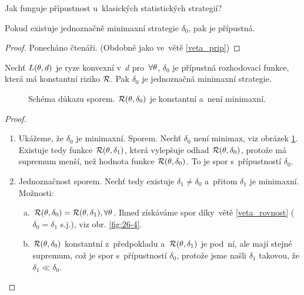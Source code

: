 Jak funguje přípustnost u~klasických statistických strategií?
\begin{theorem}\label{veta_mini}
	Pokud existuje jednoznačně minimaxní strategie $\delta_0$, pak je přípustná.\begin{proof}
		Ponecháno čtenáři. (Obdobně jako ve~větě \ref{veta_prip})
	\end{proof}
\end{theorem}
\begin{theorem}["Obrátka"]
	Nechť $L(\theta,d)$ je ryze konvexní v~$d$ pro~$\forall\theta$, $\delta_0$ je přípustná rozhodovací funkce, která má konstantní riziko $\mathcal{R}$. Pak $\delta_0$ je jednoznačná minimaxní strategie.
	\begin{figure}[h]
		\centering
		\caption{Schéma důkazu sporem. $ \mathcal{R}(\theta,\delta_0)$ je konstantní a~není minimaxní.}
		\label{fig:26-3}
	\end{figure}
	
	\begin{proof}
		\begin{enumerate}[1)]
			\item Ukážeme, že $\delta_0$ je minimaxní. Sporem. Nechť $\delta_0$ není minimax, viz obrázek \ref{fig:26-3}. Existuje tedy funkce $\mathcal{R}(\theta,\delta_1)$, která  vylepšuje odhad $\mathcal{R}(\theta,\delta_0)$, protože má supremum menší, než hodnota funkce $\mathcal{R}(\theta,\delta_0)$. To je spor s~přípustností $\delta_0$.
			\item Jednoznačnost sporem. Nechť tedy existuje $\delta_1\neq\delta_0$ a~přitom $\delta_1$ je minimaxní. Možnosti:
			\begin{enumerate}[a)]
				\item $\mathcal{R}(\theta,\delta_0)=\mathcal{R}(\theta,\delta_1),\forall\theta$. Ihned získáváme spor díky~větě \ref{veta_rovnost} ($\delta_0=\delta_1$ s.j.), viz obr. \ref{fig:26-4}.
				\item $\mathcal{R}(\theta,\delta_0)$ konstantní z~předpokladu a~$\mathcal{R}(\theta,\delta_1)$ je pod~ní, ale mají stejné supremum, což je spor s~přípustností $\delta_0$, protože jsme našli $\delta_1$ takovou, že $\delta_1\ll\delta_0$.
			\end{enumerate}
			

\end{enumerate}
\end{proof}
\end{theorem}
